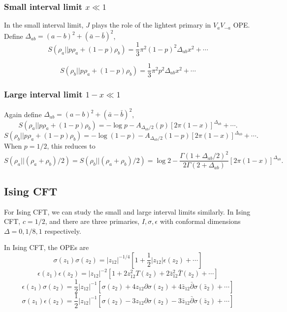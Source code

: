 \documentclass{article}
\theoremstyle{plain}
\theoremstyle{definition}
\theoremstyle{plain}
\begin{document}
\subsubsection{Small interval limit $x \ll 1$}
In the small interval limit, $J$ plays the role of the lightest primary in $V_a V_{-a}$ OPE. Define $\Delta_{ab}=(a-b)^2+(\bar a-\bar b)^2$,
\begin{equation}
 S(\rho_a||p\rho_a+(1-p)\rho_b) = \frac{1}{3}\pi^2(1-p)^2\Delta_{ab} x^2+\cdots
\end{equation}

\begin{equation}
S(\rho_b||p\rho_a+(1-p)\rho_b) = \frac{1}{3}\pi^2p^2\Delta_{ab} x^2+\cdots
\end{equation}

\subsubsection{Large interval limit $1-x \ll 1$ }
Again define $\Delta_{ab}=(a-b)^2+(\bar a-\bar b)^2$,
\begin{equation}
    S(\rho_a||p \rho_a +(1-p)\rho_b)= -\log p - A_{\Delta_{ab}/2}(p)[2\pi(1-x)]^{\Delta_{ab}} +\cdots.
\end{equation}
\begin{equation}
    S(\rho_b||p \rho_a +(1-p)\rho_b)= -\log (1-p) - A_{\Delta_{ab}/2}(1-p)[2\pi(1-x)]^{\Delta_{ab}} +\cdots.
\end{equation}
When $p=1/2$, this reduces to 
\begin{equation}
    S(\rho_a|| (\rho_a +\rho_b)/2)=S(\rho_b|| (\rho_a +\rho_b)/2)=\log 2 - \frac{\Gamma(1+\Delta_{ab}/2)^2}{2\Gamma(2+\Delta_{ab})}[2\pi(1-x)]^{\Delta_{ab}}.
\end{equation}

\subsection{Ising CFT}
For Ising CFT, we can study the small and large interval limits similarly. In Ising CFT, $c=1/2$, and there are three primaries, $I,\sigma,\epsilon$ with conformal dimensions $\Delta=0,1/8,1$ respectively.

In Ising CFT, the OPEs are
\begin{equation}
    \sigma(z_1)\sigma(z_2) = |z_{12}|^{-1/4}[1+ \frac{1}{2} |z_{12}| \epsilon(z_2)+\cdots]
\end{equation}
\begin{equation}
    \epsilon(z_1)\epsilon(z_2) = |z_{12}|^{-2}[1+ 2 z_{12}^2 T(z_2) +2 \bar z_{12}^2 \bar T(z_2) +\cdots]
\end{equation}
\begin{equation}
   \epsilon(z_1) \sigma(z_2) = \frac{1}{2}|z_{12}|^{-1}[\sigma(z_2)+ 4z_{12} \partial \sigma(z_2) + 4\bar z_{12}\bar \partial \sigma(\bar z_2) +\cdots]
\end{equation}
\begin{equation}
   \sigma(z_1) \epsilon(z_2) = \frac{1}{2}|z_{12}|^{-1}[\sigma(z_2)-3z_{12} \partial \sigma(z_2) -3\bar z_{12}\bar \partial \sigma(\bar z_2) +\cdots]
\end{equation}
\end{document}
